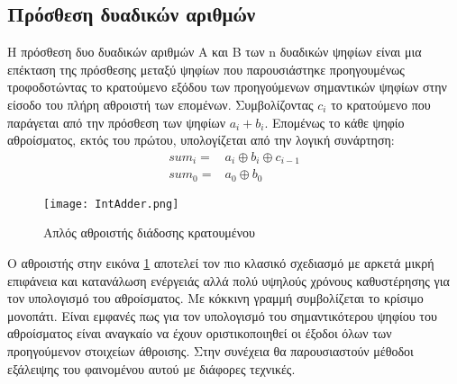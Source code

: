 % 
\subsection{Πρόσθεση δυαδικών αριθμών}

Η πρόσθεση δυο δυαδικών αριθμών A και Β των n δυαδικών ψηφίων είναι 
μια επέκταση της πρόσθεσης μεταξύ ψηφίων που παρουσιάστηκε προηγουμένως τροφοδοτώντας 
το κρατούμενο εξόδου των προηγούμενων σημαντικών ψηφίων στην είσοδο του πλήρη αθροιστή 
των επομένων. Συμβολίζοντας $c_{i}$ το κρατούμενο που παράγεται από την πρόσθεση των ψηφίων 
$a_i+b_i$. Επομένως το κάθε ψηφίο αθροίσματος, εκτός του πρώτου, υπολογίζεται από την 
λογική συνάρτηση:
\begin{equation}
\begin{split}
    sum_i =& a_i \oplus b_i \oplus c_{i-1}\\
    sum_0 =& a_0 \oplus b_0    
\end{split}
\end{equation}

\begin{figure}[H]
    \centering
    \texttt{[image: IntAdder.png]}
    \caption{Απλός αθροιστής διάδοσης κρατουμένου}
    \label{IntegerAdderSchematic}
\end{figure}
Ο αθροιστής στην εικόνα \ref{IntegerAdderSchematic} αποτελεί τον πιο κλασικό σχεδιασμό 
με αρκετά μικρή επιφάνεια και κατανάλωση ενέργειάς αλλά πολύ υψηλούς χρόνους καθυστέρησης 
για τον υπολογισμό του αθροίσματος. Με κόκκινη γραμμή συμβολίζεται το κρίσιμο μονοπάτι. Είναι εμφανές πως για τον υπολογισμό του σημαντικότερου ψηφίου του αθροίσματος είναι αναγκαίο να έχουν οριστικοποιηθεί οι έξοδοι όλων των προηγούμενον στοιχείων άθροισης. Στην συνέχεια θα παρουσιαστούν μέθοδοι εξάλειψης του φαινομένου αυτού με διάφορες τεχνικές.



